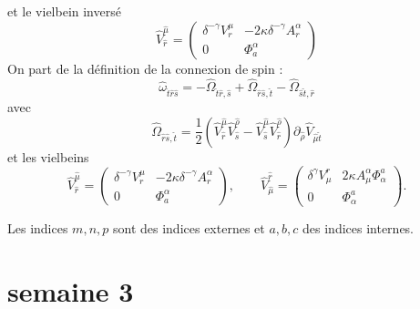 \documentclass{article}
\begin{document}
et le vielbein  inversé
\begin{equation}
    \hat{V}^{\hat{\mu}}_{\hat r} = \begin{pmatrix} \delta^{- \gamma} V^\mu_r & -2 \kappa \delta^{- \gamma}A^\alpha_r  \\ 0 & \Phi_a^\alpha \end{pmatrix}
\end{equation}
On part de la définition de la connexion de spin :
\begin{equation}
\hat{\omega}_{\hat{t}\hat{r}\hat{s}} = -\hat{\Omega}_{\hat{t}\hat{r},\hat{s}} + \hat{\Omega}_{\hat{r}\hat{s},\hat{t}} - \hat{\Omega}_{\hat{s}\hat{t},\hat{r}}
\end{equation}
avec
\begin{equation}
\hat{\Omega}_{\hat{r}\hat{s},\hat{t}} = \frac{1}{2}\left(\hat{V}^{\hat{\mu}}_{\hat{r}}\hat{V}^{\hat{\rho}}_{\hat{s}} - \hat{V}^{\hat{\mu}}_{\hat{s}}\hat{V}^{\hat{\rho}}_{\hat{r}}\right)\partial_{\hat{\rho}}\hat{V}_{\hat{\mu}\hat{t}}
\end{equation}
et les vielbeins
\begin{equation}
\hat{V}^{\hat{\mu}}_{\hat{r}} = \begin{pmatrix} \delta^{-\gamma}V^{\mu}_{r} & -2\kappa\delta^{-\gamma}A^{\alpha}_{r} \\ 0 & \Phi^{\alpha}_{a} \end{pmatrix}, \qquad \hat{V}^{\hat{r}}_{\hat{\mu}} = \begin{pmatrix} \delta^{\gamma}V^{r}_{\mu} & 2\kappa A^{\alpha}_{\mu}\Phi^{a}_{\alpha} \\ 0 & \Phi^{a}_{\alpha} \end{pmatrix}.
\end{equation}
 
Les indices $m,n,p$ sont des indices externes et $a,b,c$ des indices internes.
 
\section{semaine 3}
\end{document}
